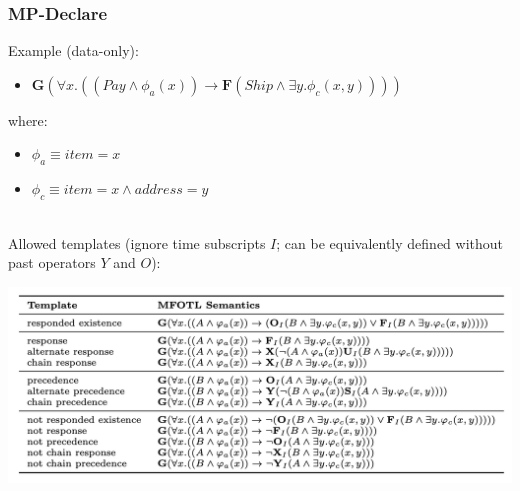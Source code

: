 \documentclass[xcolor=dvipsnames,aspectratio=169]{beamer}
\newcommand{\always}{\mathbf{G}\xspace}
\newcommand{\eventually}{\mathbf{F}\xspace}
\begin{document}
\begin{frame}
\frametitle{MP-Declare}
Example (data-only):

\begin{itemize}
	\item $\always(\forall x.((Pay\land\phi_a(x)) \rightarrow \eventually (Ship \land\exists y.\phi_c(x, y))))$
\end{itemize}

where:
\begin{itemize}
	\item $\phi_a\equiv item=x$ 
	\item $\phi_c\equiv item= x \land address=y$ 
\end{itemize}

~\\

Allowed templates
(\footnotesize{ignore time subscripts $I$; can be equivalently defined without past operators $Y$ and $O$}):

\begin{center}
\includegraphics[scale=.3]{figures/mp-declare}
\end{center}



\end{frame}

\end{document}
